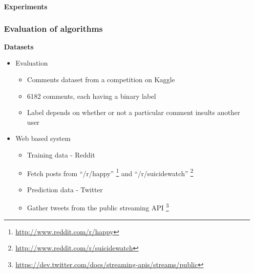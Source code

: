 \documentclass{beamer}
\begin{document}
    \begin{frame}
        \begin{center}
            \textbf{Experiments}
        \end{center}
    \end{frame}
    
    \begin{frame}
        \frametitle{Evaluation of algorithms}
        \begin{center}
            \textbf{Datasets}
        \end{center}
        \begin{itemize}
            \item{
            Evaluation
            \begin{itemize}
                \item{Comments dataset from a competition on Kaggle}
                \item{6182 comments, each having a binary label}
                \item{Label depends on whether or not a particular comment insults another user}
            \end{itemize}
            }
            \item{
            Web based system
            \begin{itemize}
                \item{Training data - Reddit}
                \item{Fetch posts from ``/r/happy'' \footnote{\url{http://www.reddit.com/r/happy}} and ``/r/suicidewatch'' \footnote{\url{http://www.reddit.com/r/suicidewatch}}}
                \item{Prediction data - Twitter}
                \item{Gather tweets from the public streaming API \footnote{\url{https://dev.twitter.com/docs/streaming-apis/streams/public}}}
            \end{itemize}
            }
        \end{itemize}
    \end{frame}
    
\end{document}
